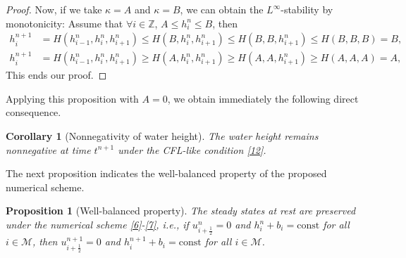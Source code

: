 \documentclass[11pt,a4paper,center,notitlepage]{article}
\numberwithin{equation}{section}
\newtheorem{corollary}{Corollary}
\newtheorem{prop}{Proposition}
\begin{document}
\begin{proof}
Now, if we take $\kappa = A$ and $\kappa = B$, we can obtain the $L^\infty$-stability by monotonicity: Assume that $\forall i \in \mathbb{Z}$, $A\le h_i^n \le B$, then 
\begin{align*}
h_i^{n + 1} &= H\left( {h_{i - 1}^n,h_i^n,h_{i + 1}^n} \right) \le H\left( {B,h_i^n,h_{i + 1}^n} \right) \le H\left( {B,B,h_{i + 1}^n} \right) \le H\left( {B,B,B} \right) = B,\\
h_i^{n + 1} &= H\left( {h_{i - 1}^n,h_i^n,h_{i + 1}^n} \right) \ge H\left( {A,h_i^n,h_{i + 1}^n} \right) \ge H\left( {A,A,h_{i + 1}^n} \right) \ge H\left( {A,A,A} \right) = A,
\end{align*}
This ends our proof.
\end{proof}
Applying this proposition with $A=0$, we obtain immediately the following direct consequence. 

\begin{corollary}[Nonnegativity of water height]\label{corollary1}
The water height remains nonnegative at time $t^{n+1}$ under the CFL-like condition \eqref{12}.
\end{corollary}
The next proposition indicates the well-balanced property of the proposed numerical scheme.
\begin{prop}[Well-balanced property]
\label{prop4}
The steady states at rest are preserved under the numerical scheme \eqref{6}-\eqref{7}, i.e., if $u_{i+\frac{1}{2}}^n=0$ and $h_i^n + b_i = \mbox{const}$ for all $i\in \mathcal{M}$, then $u_{i+\frac{1}{2}}^{n+1} = 0$ and $h_i^{n+1} + b_i =\mbox{const}$ for all $i \in \mathcal{M}$.
\end{prop}
\end{document}
